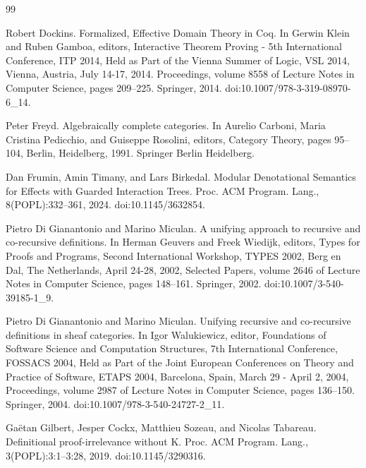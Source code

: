 \documentclass[10pt,a4paper]{article}
\begin{document}
\begin{thebibliography}{99}
\par\noindent    Robert Dockins.  Formalized, Effective Domain Theory in Coq.  In Gerwin Klein and Ruben Gamboa, editors, Interactive Theorem Proving - 5th International Conference, ITP 2014, Held as Part of the Vienna Summer of Logic, VSL 2014, Vienna, Austria, July 14-17, 2014. Proceedings, volume 8558 of Lecture Notes in Computer Science, pages 209–225. Springer, 2014.  doi:10.1007/978-3-319-08970-6\_14.  

\par\noindent    Peter Freyd.  Algebraically complete categories.  In Aurelio Carboni, Maria Cristina Pedicchio, and Guiseppe Rosolini, editors, Category Theory, pages 95–104, Berlin, Heidelberg, 1991. Springer Berlin Heidelberg.  

\par\noindent    Dan Frumin, Amin Timany, and Lars Birkedal.  Modular Denotational Semantics for Effects with Guarded Interaction Trees.  Proc. ACM Program. Lang., 8(POPL):332–361, 2024.  doi:10.1145/3632854.  

\par\noindent    Pietro Di Gianantonio and Marino Miculan.  A unifying approach to recursive and co-recursive definitions.  In Herman Geuvers and Freek Wiedijk, editors, Types for Proofs and Programs, Second International Workshop, TYPES 2002, Berg en Dal, The Netherlands, April 24-28, 2002, Selected Papers, volume 2646 of Lecture Notes in Computer Science, pages 148–161. Springer, 2002.  doi:10.1007/3-540-39185-1\_9.  

\par\noindent    Pietro Di Gianantonio and Marino Miculan.  Unifying recursive and co-recursive definitions in sheaf categories.  In Igor Walukiewicz, editor, Foundations of Software Science and Computation Structures, 7th International Conference, FOSSACS 2004, Held as Part of the Joint European Conferences on Theory and Practice of Software, ETAPS 2004, Barcelona, Spain, March 29 - April 2, 2004, Proceedings, volume 2987 of Lecture Notes in Computer Science, pages 136–150. Springer, 2004.  doi:10.1007/978-3-540-24727-2\_11.  

\par\noindent    Gaëtan Gilbert, Jesper Cockx, Matthieu Sozeau, and Nicolas Tabareau.  Definitional proof-irrelevance without K.  Proc. ACM Program. Lang., 3(POPL):3:1–3:28, 2019.  doi:10.1145/3290316.  


\end{thebibliography}
\end{document}
